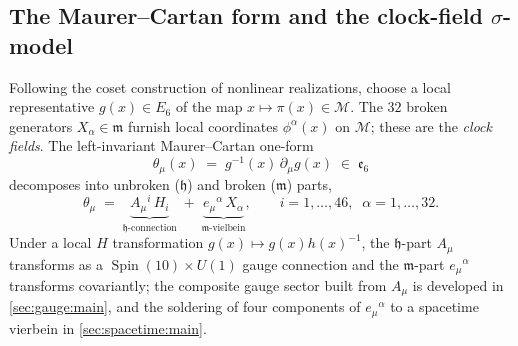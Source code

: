 \documentclass[11pt]{article}
\theoremstyle{plain}
\theoremstyle{definition}
\theoremstyle{remark}
\newcommand{\Spin}{\operatorname{Spin}}
\begin{document}
\subsection{The Maurer--Cartan form and the clock-field \texorpdfstring{$\sigma$}{sigma}-model}
\label{sec:coset:sigma}

Following the coset construction of nonlinear realizations, choose a local
representative $g(x)\in E_{6}$ of the map $x\mapsto\pi(x)\in\mathcal M$. The
$32$ broken generators $X_{\alpha}\in\mathfrak m$ furnish local coordinates
$\phi^{\alpha}(x)$ on $\mathcal M$; these are the \emph{clock fields}. The
left-invariant Maurer--Cartan one-form
\begin{equation}\label{eq:coset:MC}
  \theta_{\mu}(x) \;=\; g^{-1}(x)\,\partial_{\mu}g(x)\;\in\;\mathfrak e_{6}
\end{equation}
decomposes into unbroken ($\mathfrak h$) and broken ($\mathfrak m$) parts,
\begin{equation}\label{eq:coset:MCsplit}
  \theta_{\mu}
   \;=\; \underbrace{A_{\mu}{}^{i}\,H_{i}}_{\mathfrak h\text{-connection}}
        \;+\;
         \underbrace{e_{\mu}{}^{\alpha}\,X_{\alpha}}_{\mathfrak m\text{-vielbein}},
  \qquad i = 1,\dots,46,\;\; \alpha = 1,\dots,32 .
\end{equation}
Under a local $H$ transformation $g(x)\mapsto g(x)h(x)^{-1}$, the $\mathfrak
h$-part $A_{\mu}$ transforms as a $\Spin(10)\times U(1)$ gauge connection and the
$\mathfrak m$-part $e_{\mu}{}^{\alpha}$ transforms covariantly; the composite
gauge sector built from $A_{\mu}$ is developed in \autoref{sec:gauge:main}, and the
soldering of four components of $e_{\mu}{}^{\alpha}$ to a spacetime vierbein in
\autoref{sec:spacetime:main}.
\end{document}

